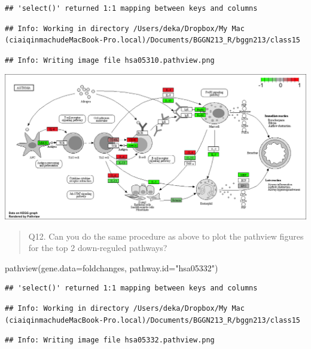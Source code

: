 \documentclass[
]{article}
\newenvironment{Shaded}{\begin{snugshade}}{\end{snugshade}}
\newcommand{\AttributeTok}[1]{\textcolor[rgb]{0.77,0.63,0.00}{#1}}
\newcommand{\FunctionTok}[1]{\textcolor[rgb]{0.00,0.00,0.00}{#1}}
\newcommand{\NormalTok}[1]{#1}
\newcommand{\StringTok}[1]{\textcolor[rgb]{0.31,0.60,0.02}{#1}}
\begin{document}
\begin{verbatim}
## 'select()' returned 1:1 mapping between keys and columns
\end{verbatim}

\begin{verbatim}
## Info: Working in directory /Users/deka/Dropbox/My Mac (ciaiqinmachudeMacBook-Pro.local)/Documents/BGGN213_R/bggn213/class15
\end{verbatim}

\begin{verbatim}
## Info: Writing image file hsa05310.pathview.png
\end{verbatim}

\includegraphics{hsa05310.pathview.png}

\begin{quote}
Q12. Can you do the same procedure as above to plot the pathview figures
for the top 2 down-reguled pathways?
\end{quote}

\begin{Shaded}
\begin{Highlighting}[]
\FunctionTok{pathview}\NormalTok{(}\AttributeTok{gene.data=}\NormalTok{foldchanges, }\AttributeTok{pathway.id=}\StringTok{"hsa05332"}\NormalTok{)}
\end{Highlighting}
\end{Shaded}

\begin{verbatim}
## 'select()' returned 1:1 mapping between keys and columns
\end{verbatim}

\begin{verbatim}
## Info: Working in directory /Users/deka/Dropbox/My Mac (ciaiqinmachudeMacBook-Pro.local)/Documents/BGGN213_R/bggn213/class15
\end{verbatim}

\begin{verbatim}
## Info: Writing image file hsa05332.pathview.png
\end{verbatim}
\end{document}

